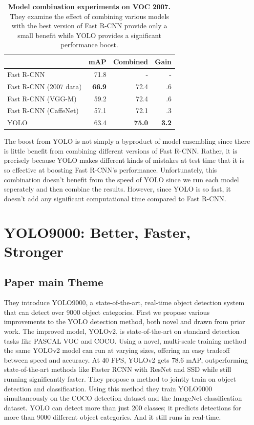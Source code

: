 \documentclass{ieeeaccess}
\begin{document}
\begin{table}[htb]
	\centering
	\renewcommand{\arraystretch}{1.2}
		\begin{tabular}{l r r r}
			 & mAP & Combined   & Gain\\
			\hline
			Fast R-CNN & 71.8 & - & - \\
			\hline
			Fast R-CNN (2007 data) & \textbf{66.9} & 72.4 & .6 \\
			Fast R-CNN (VGG-M) & 59.2 & 72.4 & .6 \\
			Fast R-CNN (CaffeNet) & 57.1 & 72.1 & .3 \\
			YOLO & 63.4 & \textbf{75.0} & \textbf{3.2} \\
		\end{tabular}
		\caption{\textbf{Model combination experiments on VOC 2007.} They examine the effect of combining various models with the best version of Fast R-CNN provide only a small benefit while YOLO provides a significant performance boost.}
	\label{Table_1}
\end{table}

The boost from YOLO is not simply a byproduct of model ensembling since there is little benefit from combining different versions of Fast R-CNN. Rather, it is precisely because YOLO makes different kinds of mistakes at test time that it is so effective at boosting Fast R-CNN’s performance.
Unfortunately, this combination doesn’t benefit from the speed of YOLO since we run each model seperately and then combine the results. However, since YOLO is so fast, it doesn’t add any significant computational time compared to Fast R-CNN.


\section{YOLO9000: Better, Faster, Stronger}
\subsection{Paper main Theme}
They introduce YOLO9000, a state-of-the-art, real-time object detection system that can detect over 9000 object categories. First we propose various improvements to the YOLO detection method, both novel and drawn from prior work. The improved model, YOLOv2, is state-of-the-art on standard detection tasks like PASCAL VOC and COCO. Using a novel, multi-scale training method the same YOLOv2 model can run at varying sizes, offering an easy tradeoff between speed and accuracy.
At 40 FPS, YOLOv2 gets 78.6 mAP, outperforming state-of-the-art methods like Faster RCNN with ResNet and SSD while still running significantly faster. They propose a method to jointly train on object detection and classification. Using this method they train YOLO9000 simultaneously on the COCO detection dataset and the ImageNet classification dataset. YOLO can detect more than just 200 classes; it predicts detections for more than 9000 different object categories. And it still runs in real-time.
\end{document}
